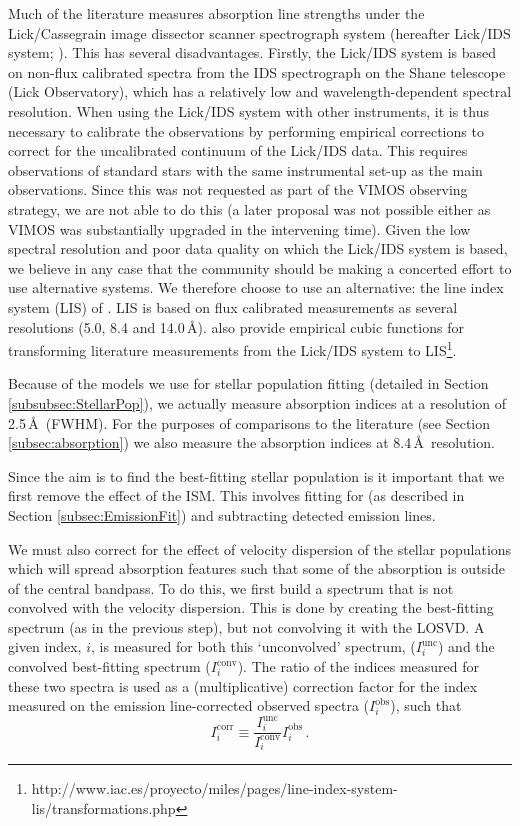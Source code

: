 			Much of the literature measures absorption line strengths under the Lick/Cassegrain image dissector scanner spectrograph system (hereafter Lick/IDS system; \citealt{Faber1985, Worthey1994}). This has several disadvantages. Firstly, the Lick/IDS system is based on non-flux calibrated spectra from the IDS spectrograph on the Shane telescope (Lick Observatory), which has a relatively low and wavelength-dependent spectral resolution. When using the Lick/IDS system with other instruments, it is thus necessary to calibrate the observations by performing empirical corrections to correct for the uncalibrated continuum of the Lick/IDS data. This requires observations of standard stars with the same instrumental set-up as the main observations. Since this was not requested as part of the VIMOS observing strategy, we are not able to do this (a later proposal was not possible either as VIMOS was substantially upgraded in the intervening time). Given the low spectral resolution and poor data quality on which the Lick/IDS system is based, we believe in any case that the community should be making a concerted effort to use alternative systems. We therefore choose to use an alternative: the line index system (LIS) of \citet{Vazdekis2010}. LIS is based on flux calibrated measurements as several resolutions (5.0, 8.4 and 14.0\,\AA). \citet{Vazdekis2010} also provide empirical cubic functions for transforming literature measurements from the Lick/IDS system to LIS\footnote{http://www.iac.es/proyecto/miles/pages/line-index-system-lis/transformations.php}.

			Because of the models we use for stellar population fitting (detailed in Section \ref{subsubsec:StellarPop}), we actually measure absorption indices at a resolution of 2.5\,\AA\ (FWHM). For the purposes of comparisons to the literature (see Section \ref{subsec:absorption}) we also measure the absorption indices at 8.4\,\AA\ resolution. 

			Since the aim is to find the best-fitting stellar population is it important that we first remove the effect of the ISM. This involves fitting for (as described in Section \ref{subsec:EmissionFit}) and subtracting detected emission lines. 

			We must also correct for the effect of velocity dispersion of the stellar populations which will spread absorption features such that some of the absorption is outside of the central bandpass. To do this, we first build a spectrum that is not convolved with the velocity dispersion. This is done by creating the best-fitting spectrum (as in the previous step), but not convolving it with the LOSVD. A given index, $i$, is measured for both this `unconvolved' spectrum, ($I^\text{unc}_i$) and the convolved best-fitting spectrum ($I^\text{conv}_i$). The ratio of the indices measured for these two spectra is used as a (multiplicative) correction factor for the index measured on the emission line-corrected observed spectra ($I^\text{obs}_i$), such that
			\begin{equation}
				I^\text{corr}_i \equiv \frac{I^\text{unc}_i}{I^\text{conv}_i} I^\text{obs}_i \, .
			\end{equation}


